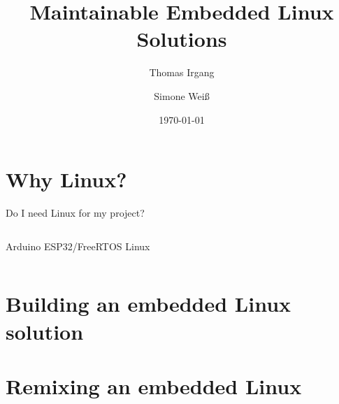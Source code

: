 \documentclass{beamer}
\title{Maintainable Embedded Linux Solutions}
\author{Thomas Irgang \and Simone Weiß}
\date{\today}
\begin{document}
\begin{frame}
    \titlepage
\end{frame}

\section{Why Linux?}


\begin{frame}{Do I need Linux for my project?}
    \begin{columns}
        \centering
        Arduino
        \centering
        ESP32/FreeRTOS
        \centering
        Linux
    \end{columns}
\end{frame}




\section{Building an embedded Linux solution}





\section{Remixing an embedded Linux}

\end{document}

